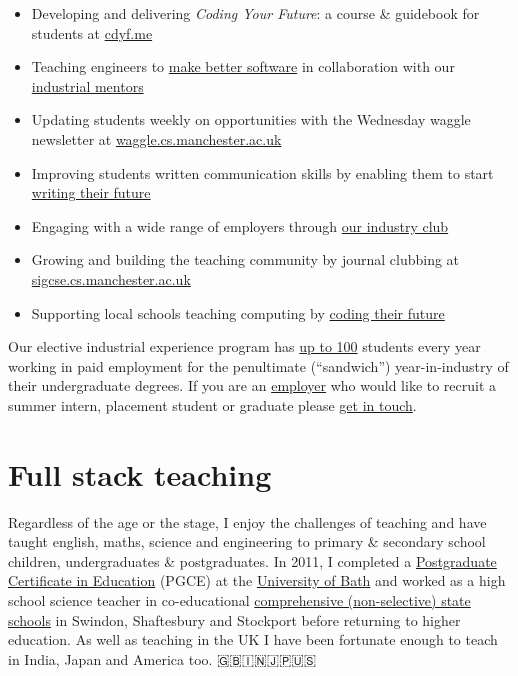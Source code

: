 \documentclass[
  12pt,
]{book}
\providecommand{\tightlist}{%
  \setlength{\itemsep}{0pt}\setlength{\parskip}{0pt}}
\begin{document}
\begin{itemize}
\tightlist
\item
  Developing and delivering \emph{Coding Your Future}: a course \& guidebook for students at \href{https://www.cdyf.me}{cdyf.me}
\item
  Teaching engineers to \href{https://software-eng.netlify.app/}{make better software} in collaboration with our \href{https://www.cs.manchester.ac.uk/connect/business-engagement/industrial-mentoring/}{industrial mentors}
\item
  Updating students weekly on opportunities with the Wednesday waggle newsletter at \href{https://waggle.cs.manchester.ac.uk/waggle/about}{waggle.cs.manchester.ac.uk}
\item
  Improving students written communication skills by enabling them to start \href{https://www.cdyf.me/writing.html}{writing their future}
\item
  Engaging with a wide range of employers through \href{https://www.cs.manchester.ac.uk/connect/business-engagement/}{our industry club}
\item
  Growing and building the teaching community by journal clubbing at \href{https://sigcse.cs.manchester.ac.uk/}{sigcse.cs.manchester.ac.uk}
\item
  Supporting local schools teaching computing by \href{https://personalpages.manchester.ac.uk/staff/duncan.hull/coding-their-future.html}{coding their future}
\end{itemize}

Our elective industrial experience program has \protect\hyperlink{employability}{up to 100} students every year working in paid employment for the penultimate (``sandwich'') year-in-industry of their undergraduate degrees. If you are an \href{https://personalpages.manchester.ac.uk/staff/duncan.hull/employers.html}{employer} who would like to recruit a summer intern, placement student or graduate please \href{https://personalpages.manchester.ac.uk/staff/duncan.hull/contact.html}{get in touch}. 🐝

\hypertarget{full-stack-teaching}{%
\section*{Full stack teaching}\label{full-stack-teaching}}

Regardless of the age or the stage, I enjoy the challenges of teaching and have taught english, maths, science and engineering to primary \& secondary school children, undergraduates \& postgraduates. In 2011, I completed a \href{https://en.wikipedia.org/wiki/Postgraduate_Certificate_in_Education}{Postgraduate Certificate in Education} (PGCE) at the \href{https://www.bath.ac.uk/}{University of Bath} and worked as a high school science teacher in co-educational \href{https://www.gov.uk/types-of-school}{comprehensive (non-selective) state schools} in Swindon, Shaftesbury and Stockport before returning to higher education. As well as teaching in the UK I have been fortunate enough to teach in India, Japan and America too. 🇬🇧🇮🇳🇯🇵🇺🇸
\end{document}
